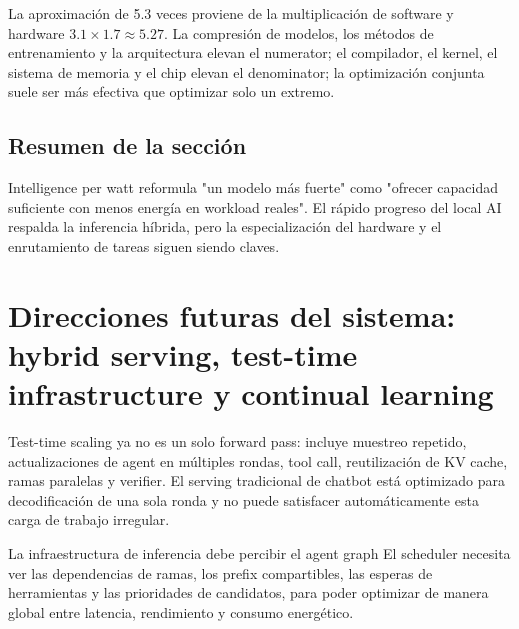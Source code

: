 \documentclass[a4paper]{article}
\begin{document}
\begin{knowledgebox}{La aproximación de 5.3 veces proviene de la multiplicación de software y hardware}
$3.1\times1.7\approx5.27$. La compresión de modelos, los métodos de entrenamiento y la arquitectura elevan el numerator; el compilador, el kernel, el sistema de memoria y el chip elevan el denominator; la optimización conjunta suele ser más efectiva que optimizar solo un extremo.
\end{knowledgebox}

\subsection{Resumen de la sección}

Intelligence per watt reformula "un modelo más fuerte" como "ofrecer capacidad suficiente con menos energía en workload reales". El rápido progreso del local AI respalda la inferencia híbrida, pero la especialización del hardware y el enrutamiento de tareas siguen siendo claves.
\section{Direcciones futuras del sistema: hybrid serving, test-time infrastructure y continual learning}


Test-time scaling ya no es un solo forward pass: incluye muestreo repetido, actualizaciones de agent en múltiples rondas, tool call, reutilización de KV cache, ramas paralelas y verifier. El serving tradicional de chatbot está optimizado para decodificación de una sola ronda y no puede satisfacer automáticamente esta carga de trabajo irregular.

\begin{importantbox}{La infraestructura de inferencia debe percibir el agent graph}
El scheduler necesita ver las dependencias de ramas, los prefix compartibles, las esperas de herramientas y las prioridades de candidatos, para poder optimizar de manera global entre latencia, rendimiento y consumo energético.
\end{importantbox}

\end{document}

